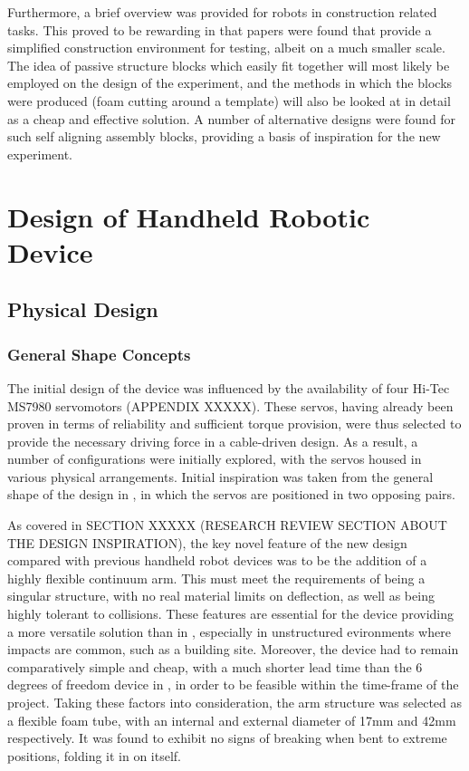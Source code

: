 \documentclass[11pt]{article}
\begin{document}
Furthermore, a brief overview was provided for robots in construction related tasks. This proved to be rewarding in that papers were found that provide a simplified construction environment for testing, albeit on a much smaller scale. The idea of passive structure blocks which easily fit together will most likely be employed on the design of the experiment, and the methods in which the blocks were produced (foam cutting around a template) will also be looked at in detail as a cheap and effective solution. A number of alternative designs were found for such self aligning assembly blocks, providing a basis of inspiration for the new experiment.


\pagebreak
\pagebreak

\section{Design of Handheld Robotic Device}

\subsection{Physical Design}
\subsubsection{General Shape Concepts}
The initial design of the device was influenced by the availability of four Hi-Tec MS7980 servomotors (APPENDIX XXXXX). These servos, having already been proven in terms of reliability and sufficient torque provision, were thus selected to provide the necessary driving force in a cable-driven design. As a result, a number of configurations were initially explored, with the servos housed in various physical arrangements. Initial inspiration was taken from the general shape of the design in \cite{GreggSmithDesign}, in which the servos are positioned in two opposing pairs.

As covered in SECTION XXXXX (RESEARCH REVIEW SECTION ABOUT THE DESIGN INSPIRATION), the key novel feature of the new design compared with previous handheld robot devices was to be the addition of a highly flexible continuum arm. This must meet the requirements of being a singular structure, with no real material limits on deflection, as well as being highly tolerant to collisions. These features are essential for the device providing a more versatile solution than in \cite{GreggSmithDesign}, especially in unstructured evironments where impacts are common, such as a building site. Moreover, the device had to remain comparatively simple and cheap, with a much shorter lead time than the 6 degrees of freedom device in \cite{GreggSmithKinematics}, in order to be feasible within the time-frame of the project. Taking these factors into consideration, the arm structure was selected as a flexible foam tube, with an internal and external diameter of 17mm and 42mm respectively. It was found to exhibit no signs of breaking when bent to extreme positions, folding it in on itself.
\end{document}
